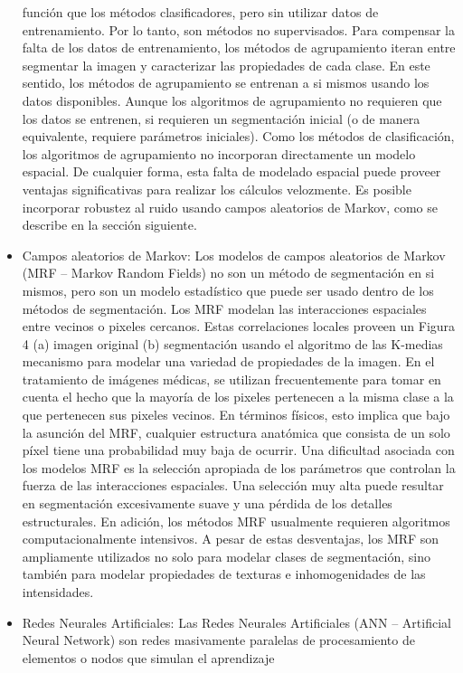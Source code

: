 \begin{itemize}
funci\'on que los m\'etodos clasificadores, pero sin utilizar datos de entrenamiento. Por lo tanto, son m\'etodos no supervisados. Para compensar la falta de los datos de entrenamiento, los m\'etodos de agrupamiento iteran entre segmentar la imagen y caracterizar las propiedades de cada clase. En este sentido, los m\'etodos de agrupamiento se entrenan a si mismos usando los datos disponibles. 
Aunque los algoritmos de agrupamiento no requieren que los datos se entrenen, si requieren un segmentaci\'on inicial (o de manera equivalente, requiere par\'ametros iniciales). Como los m\'etodos de clasificaci\'on, los algoritmos de agrupamiento no incorporan directamente un modelo espacial. De cualquier forma, esta falta de modelado espacial puede proveer ventajas significativas para realizar los c\'alculos velozmente. Es posible incorporar robustez al ruido usando campos aleatorios de Markov, como se describe en la sección siguiente.
\item Campos aleatorios de Markov: Los modelos de campos aleatorios de Markov (MRF – Markov Random Fields) no son un m\'etodo de segmentaci\'on en si mismos, pero son un modelo estad\'istico que puede ser usado dentro de los m\'etodos de segmentaci\'on. Los MRF modelan las interacciones espaciales entre vecinos o pixeles cercanos. Estas correlaciones locales proveen un Figura 4 (a) imagen original (b) segmentaci\'on usando el algoritmo de las K-medias mecanismo para modelar una variedad de propiedades de la imagen. En el tratamiento de im\'agenes m\'edicas, se utilizan frecuentemente para tomar en cuenta el hecho que la mayor\'ia de los pixeles pertenecen a la misma clase a la que pertenecen sus pixeles vecinos. En t\'erminos f\'isicos, esto implica que bajo la asunci\'on del MRF, cualquier estructura anat\'omica que consista de un solo p\'ixel tiene una probabilidad muy baja de ocurrir. Una dificultad asociada con los modelos MRF es la selección apropiada de los par\'ametros que controlan la fuerza de las interacciones espaciales. Una selecci\'on muy alta puede resultar en segmentaci\'on excesivamente suave y una p\'erdida de los detalles estructurales. En adici\'on, los m\'etodos MRF usualmente requieren algoritmos computacionalmente intensivos. A pesar de estas desventajas, los MRF son ampliamente utilizados no solo para modelar clases de segmentaci\'on, sino tambi\'en para modelar propiedades de texturas e inhomogenidades de las intensidades.
\item Redes Neurales Artificiales: Las Redes Neurales Artificiales (ANN – Artificial Neural Network) son redes masivamente paralelas de procesamiento de elementos o nodos que simulan el aprendizaje

\end{itemize}
